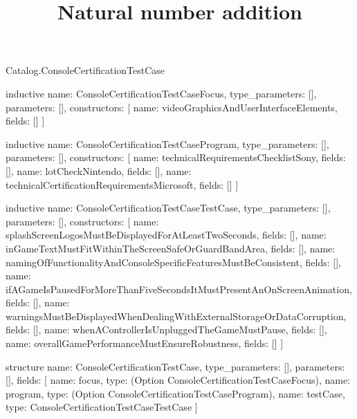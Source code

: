 \begin{lexlean}{Catalog.ConsoleCertificationTestCase}
\title{Natural number addition}
\begin{semanticmodule}
inductive{
  name: ConsoleCertificationTestCaseFocus,
  type_parameters: [],
  parameters: [],
  constructors: [
    {name: videoGraphicsAndUserInterfaceElements, fields: []}
  ]
}

inductive{
  name: ConsoleCertificationTestCaseProgram,
  type_parameters: [],
  parameters: [],
  constructors: [
    {name: technicalRequirementsChecklistSony, fields: []},
    {name: lotCheckNintendo, fields: []},
    {name: technicalCertificationRequirementsMicrosoft, fields: []}
  ]
}

inductive{
  name: ConsoleCertificationTestCaseTestCase,
  type_parameters: [],
  parameters: [],
  constructors: [
    {name: splashScreenLogosMustBeDisplayedForAtLeastTwoSeconds, fields: []},
    {name: inGameTextMustFitWithinTheScreenSafeOrGuardBandArea, fields: []},
    {name: namingOfFunctionalityAndConsoleSpecificFeaturesMustBeConsistent, fields: []},
    {name: ifAGameIsPausedForMoreThanFiveSecondsItMustPresentAnOnScreenAnimation, fields: []},
    {name: warningsMustBeDisplayedWhenDealingWithExternalStorageOrDataCorruption, fields: []},
    {name: whenAControllerIsUnpluggedTheGameMustPause, fields: []},
    {name: overallGamePerformanceMustEnsureRobustness, fields: []}
  ]
}

structure{
  name: ConsoleCertificationTestCase,
  type_parameters: [],
  parameters: [],
  fields: [
    {name: focus, type: (Option ConsoleCertificationTestCaseFocus)},
    {name: program, type: (Option ConsoleCertificationTestCaseProgram)},
    {name: testCase, type: ConsoleCertificationTestCaseTestCase}
  ]
}
\end{semanticmodule}
\end{lexlean}
